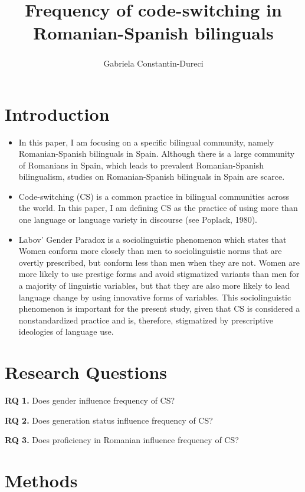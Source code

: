 \documentclass[
  english,
  man]{apa6}
\title{Frequency of code-switching in Romanian-Spanish bilinguals}
\author{Gabriela Constantin-Dureci\textsuperscript{}}
\date{}
\affiliation{\phantom{0}}
\begin{document}
\maketitle

\hypertarget{introduction}{%
\section{Introduction}\label{introduction}}

\begin{itemize}
\item
  In this paper, I am focusing on a specific bilingual community, namely Romanian-Spanish bilinguals in Spain. Although there is a large community of Romanians in Spain, which leads to prevalent Romanian-Spanish bilingualism, studies on Romanian-Spanish bilinguals in Spain are scarce.
\item
  Code-switching (CS) is a common practice in bilingual communities across the world. In this paper, I am defining CS as the practice of using more than one language or language variety in discourse (see Poplack, 1980).
\item
  Labov' Gender Paradox is a sociolinguistic phenomenon which states that Women conform more closely than men to sociolinguistic norms that are overtly prescribed, but conform less than men when they are not.
  Women are more likely to use prestige forms and avoid stigmatized variants than men for a majority of linguistic variables, but that they are also more likely to lead language change by using innovative forms of variables.
  This sociolinguistic phenomenon is important for the present study, given that CS is considered a nonstandardized practice and is, therefore, stigmatized by prescriptive ideologies of language use.
\end{itemize}

\hypertarget{research-questions}{%
\section{Research Questions}\label{research-questions}}

\textbf{RQ 1.} Does gender influence frequency of CS?

\textbf{RQ 2.} Does generation status influence frequency of CS?

\textbf{RQ 3.} Does proficiency in Romanian influence frequency of CS?

\hypertarget{methods}{%
\section{Methods}\label{methods}}
\end{document}

